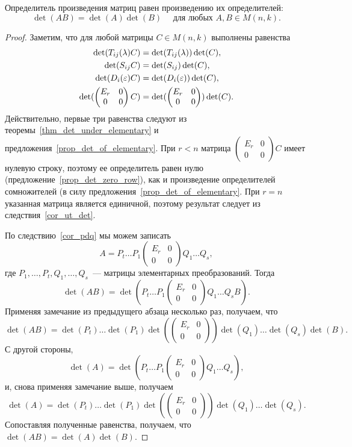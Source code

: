 \begin{theorem}\label{thm:determinant_product}
Определитель произведения матриц равен произведению их
определителей:
$$\det(AB)=\det(A)\det(B)\quad\text{ для любых }A,B\in M(n,k).$$
\end{theorem}
\begin{proof}
Заметим, что для любой матрицы $C\in M(n,k)$ выполнены равенства
\begin{align*}
\det(T_{ij}(\lambda)C) &= \det(T_{ij}(\lambda))\det(C),\\
\det(S_{ij}C) &= \det(S_{ij})\det(C),\\
\det(D_i(\varepsilon)C) &= \det(D_i(\varepsilon))\det(C),\\
\det(\begin{pmatrix}E_r & 0\\0 & 0\end{pmatrix}C) &=
\det(\begin{pmatrix}E_r & 0\\0 & 0\end{pmatrix})\det(C).
\end{align*}
Действительно, первые три равенства следуют из
теоремы~\ref{thm_det_under_elementary} и
предложения~\ref{prop_det_of_elementary}. При $r<n$ матрица
$\begin{pmatrix}E_r & 0\\0 & 0\end{pmatrix}C$ имеет нулевую строку,
поэтому ее определитель равен нулю
(предложение~\ref{prop_det_zero_row}), как и произведение
определителей сомножителей (в силу
предложения~\ref{prop_det_of_elementary}. При $r=n$ указанная матрица
является единичной, поэтому результат следует из
следствия~\ref{cor_ut_det}.

По следствию~\ref{cor_pdq} мы можем записать
$$A=P_t\dots P_1\begin{pmatrix}E_r & 0\\0 & 0\end{pmatrix}Q_1\dots
Q_s,$$
где $P_1,\dots,P_t,Q_1,\dots,Q_s$~--- матрицы элементарных
преобразований. Тогда
$$\det(AB)=\det(P_t\dots P_1\begin{pmatrix}E_r & 0\\0 &
  0\end{pmatrix}Q_1\dots Q_sB).$$ Применяя замечание из предыдущего
абзаца несколько раз, получаем, что
$$\det(AB)=\det(P_t)\dots\det(P_1)\det(\begin{pmatrix}E_r & 0\\0 &
  0\end{pmatrix})\det(Q_1)\dots\det(Q_s)\det(B).$$
С другой стороны,
$$\det(A)=\det(P_t\dots P_1\begin{pmatrix}E_r & 0\\0 &
  0\end{pmatrix}Q_1\dots Q_s),$$ и, снова применяя замечание выше,
получаем
$$\det(A)=\det(P_t)\dots\det(P_1)\det(\begin{pmatrix}E_r & 0\\0 &
  0\end{pmatrix})\det(Q_1)\dots\det(Q_s).$$ Сопоставляя полученные
равенства, получаем, что $\det(AB)=\det(A)\det(B)$.
\end{proof}


